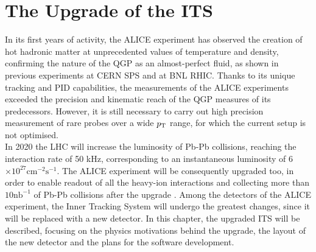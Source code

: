 \chapter{The Upgrade of the ITS}
In its first years of activity, the ALICE experiment has observed the creation of hot hadronic matter at unprecedented values of temperature and density, confirming the nature of the QGP as an almost-perfect fluid, as shown in previous experiments at CERN SPS and at BNL RHIC. Thanks to its unique tracking and PID capabilities, the measurements of the ALICE experiments exceeded the precision and kinematic reach of the QGP measures of its predecessors. However, it is still necessary to carry out high precision measurement of rare probes over a wide $p_\text{T}$ range, for which the current setup is not optimised.\\
In 2020 the LHC will increase the luminosity of Pb-Pb collisions, reaching the interaction rate of 50 kHz, corresponding to an instantaneous luminosity of 6 $\mathrm{\times 10^{27} cm^{-2}s^{-1}}$. The ALICE experiment will be consequently upgraded too, in order to enable readout of all the heavy-ion interactions and collecting more than $\mathrm{10 nb^{-1}}$ of Pb-Pb collisions after the upgrade \cite{uptdr}. Among the detectors of the ALICE experiment, the Inner Tracking System will undergo the greatest changes, since it will be replaced with a new detector. In this chapter, the upgraded ITS will be described, focusing on the physics motivations behind the upgrade, the layout of the new detector and the plans for the software development.
